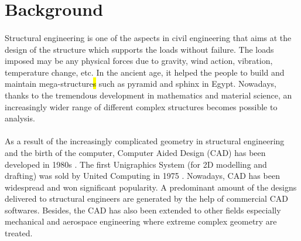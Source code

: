 \section{Background}
\paragraph{}
Structural engineering is one of the aspects in civil engineering that aims at the design of the structure which supports the loads without failure.
The loads imposed may be any physical forces due to gravity, wind action, vibration, temperature change, etc.
In the ancient age, it helped the people to build and maintain mega-structure\hl{s} such as pyramid and sphinx in Egypt.
Nowadays, thanks to the tremendous development in mathematics and material science, an increasingly wider range of different complex structures becomes possible to analysis.

\paragraph{}
As a result of the increasingly complicated geometry in structural engineering and the birth of the computer, Computer Aided Design (CAD) has been developed in 1980s \citep{Dav2008}.
The first Unigraphics System (for 2D modelling and drafting) was sold by United Computing in 1975 \citep{Ste2010}.
Nowadays, CAD has been widespread and won significant popularity.
A predominant amount of the designs delivered to structural engineers are generated by the help of commercial CAD softwares.
Besides, the CAD has also been extended to other fields especially mechanical and aerospace engineering where extreme complex geometry are treated.


